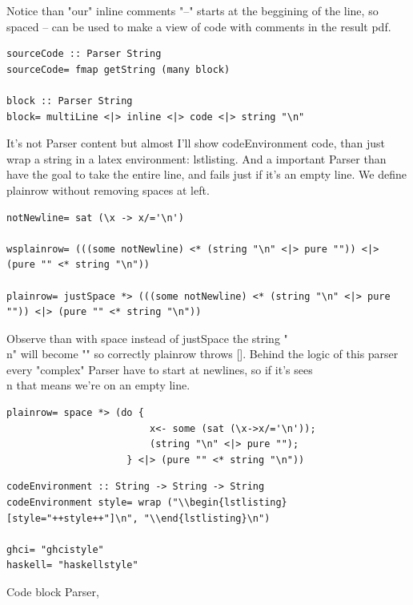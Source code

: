 \documentclass[a4papert]{article}
\begin{document}
Notice than "our" inline comments "--" starts at the beggining of the line, so spaced -- can be used to make a view of code with comments in the result pdf.

\begin{lstlisting}[style=haskellstyle]
sourceCode :: Parser String
sourceCode= fmap getString (many block)

block :: Parser String
block= multiLine <|> inline <|> code <|> string "\n"

\end{lstlisting}
It's not Parser content but almost I'll show codeEnvironment code, than just wrap a string in a latex environment: lstlisting. And a important Parser than have the goal to take the entire line, and fails just if it's an empty line. We define plainrow without removing spaces at left.

\begin{lstlisting}[style=haskellstyle]
notNewline= sat (\x -> x/='\n')

wsplainrow= (((some notNewline) <* (string "\n" <|> pure "")) <|> (pure "" <* string "\n"))

plainrow= justSpace *> (((some notNewline) <* (string "\n" <|> pure "")) <|> (pure "" <* string "\n"))
\end{lstlisting}
Observe than with space instead of justSpace the string "\\n" will become "" so correctly plainrow throws []. Behind the logic of this parser every "complex" Parser have to start at newlines, so if it's sees \\n that means we're on an empty line.

\begin{lstlisting}[style=haskellstyle]
plainrow= space *> (do {
                         x<- some (sat (\x->x/='\n'));
                         (string "\n" <|> pure "");
                     } <|> (pure "" <* string "\n"))
\end{lstlisting}
\begin{lstlisting}[style=haskellstyle]
codeEnvironment :: String -> String -> String
codeEnvironment style= wrap ("\\begin{lstlisting}[style="++style++"]\n", "\\end{lstlisting}\n")

ghci= "ghcistyle"
haskell= "haskellstyle"

\end{lstlisting}
Code block Parser,
\end{document}
